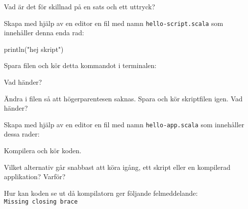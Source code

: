 \TaskPen Vad är det för skillnad på en sats och ett uttryck?

\Task Skapa med hjälp av en editor en fil med namn \texttt{hello-script.scala} som innehåller denna enda rad:
\begin{Code}
println("hej skript")
\end{Code}
Spara filen och kör detta kommandot  i terminalen:


\Subtask Vad händer?

\Subtask Ändra i filen så att högerparentesen saknas. Spara och kör skriptfilen igen. Vad händer?

\Task Skapa med hjälp av en editor en fil med namn \texttt{hello-app.scala} som innehåller dessa rader:

Kompilera och kör koden.

\Subtask Vilket alternativ går snabbast att köra igång, ett skript eller en kompilerad applikation? Varför?

\Subtask Hur kan koden se ut då kompilatorn ger följande felmeddelande: \\
\texttt{Missing closing brace}

\lipsum[7]

\ExtraTasks
\lipsum[2]

\AdvancedTasks
\lipsum[2]